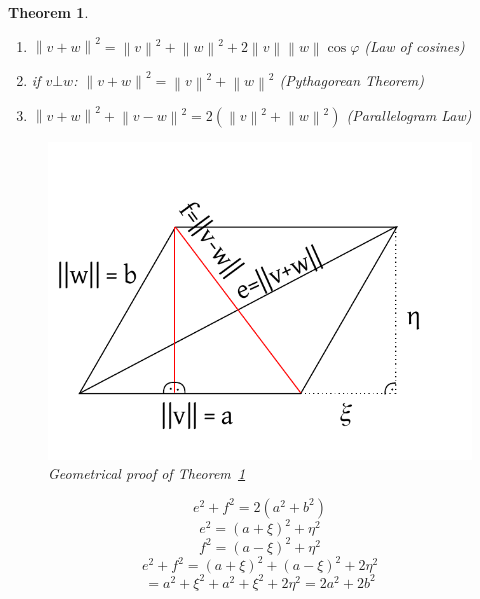 \documentclass{article}
\newcounter{lecref}[section]
\numberwithin{lecref}{section}
\newtheorem{theorem}[lecref]{Theorem}
\newcommand{\norm}[1]{\left\|#1\right\|}
\begin{document}
\begin{theorem} %
  \label{thm834}
  \begin{enumerate}
    \item $\norm{v + w}^2 = \norm{v}^2 + \norm{w}^2 + 2 \norm v \norm w \cos{\varphi}$ (Law of cosines)
    \item if $v \bot w$: $\norm {v + w}^2 = \norm{v}^2 + \norm{w}^2$ (Pythagorean Theorem)
    \item $\norm{v + w}^2 + \norm{v - w}^2 = 2 (\norm{v}^2 + \norm{w}^2)$ (Parallelogram Law)
  \end{enumerate}

  \begin{figure}[!ht]
    \begin{center}
      \includegraphics{img/06_geometrical_proof.pdf}
      \caption{Geometrical proof of Theorem~\ref{thm834}}
    \end{center}
  \end{figure}

  \[ e^2 + f^2 = 2 (a^2 + b^2) \]
  \[ e^2 = (a + \xi)^2 + \eta^2 \]
  \[ f^2 = (a - \xi)^2 + \eta^2 \]
  \[ e^2 + f^2 = (a + \xi)^2 + (a - \xi)^2 + 2\eta^2 \]
  \[ = a^2 + \xi^2 + a^2 + \xi^2 + 2\eta^2 = 2a^2 + 2b^2 \]
\end{theorem}
\end{document}
